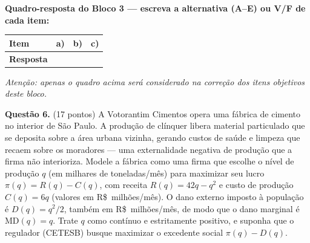 \ifsolucao\else
\par\vspace{0.5em}
\begin{center}
\textbf{Quadro-resposta do Bloco 3 --- escreva a alternativa (A--E) ou V/F de cada item:}\\[0.6em]
\renewcommand{\arraystretch}{1.45}
\begin{tabular}{|>{\centering\arraybackslash}p{2.6cm}|>{\centering\arraybackslash}p{1.4cm}|>{\centering\arraybackslash}p{1.4cm}|>{\centering\arraybackslash}p{1.4cm}|}
  \hline
  \textbf{Item} & a) & b) & c) \\ \hline
  \textbf{Resposta} &  &  &  \\ \hline
\end{tabular}
\end{center}
{\small\itshape Atenção: apenas o quadro acima será considerado na correção dos itens objetivos deste bloco.}\par\vspace{0.6em}
\fi

\textbf{Questão 6.} (17 pontos) A Votorantim Cimentos opera uma fábrica de cimento no interior de São Paulo. A produção de clínquer libera material particulado que se deposita sobre a área urbana vizinha, gerando custos de saúde e limpeza que recaem sobre os moradores — uma externalidade negativa de produção que a firma não interioriza. Modele a fábrica como uma firma que escolhe o nível de produção $q$ (em milhares de toneladas/mês) para maximizar seu lucro $\pi(q)=R(q)-C(q)$, com receita $R(q)=42q-q^{2}$ e custo de produção $C(q)=6q$ (valores em R\$~milhões/mês). O dano externo imposto à população é $D(q)=q^{2}/2$, também em R\$~milhões/mês, de modo que o dano marginal é $\text{MD}(q)=q$. Trate $q$ como contínuo e estritamente positivo, e suponha que o regulador (CETESB) busque maximizar o excedente social $\pi(q)-D(q)$.

